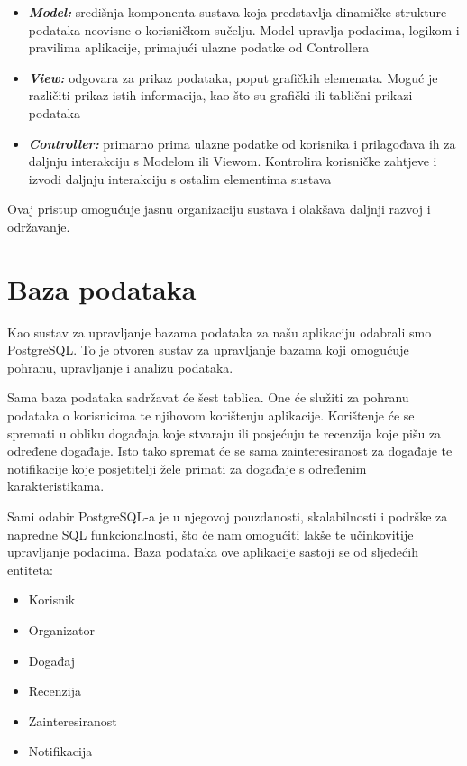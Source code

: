 	\begin{itemize}
		\item 	\textit{\textbf{Model:}}	središnja komponenta sustava koja predstavlja dinamičke strukture podataka neovisne o korisničkom sučelju. Model upravlja podacima, logikom i pravilima aplikacije, primajući ulazne podatke od Controllera
		\item 	\textit{\textbf{View:}}	odgovara za prikaz podataka, poput grafičkih elemenata. Moguć je različiti prikaz istih informacija, kao što su grafički ili tablični prikazi podataka
		\item 	\textit{\textbf{Controller:}} primarno prima ulazne podatke od korisnika i prilagođava ih za daljnju interakciju s Modelom ili Viewom. Kontrolira korisničke zahtjeve i izvodi daljnju interakciju s ostalim elementima sustava
	\end{itemize}
	
	Ovaj pristup omogućuje jasnu organizaciju sustava i olakšava daljnji razvoj i održavanje.

		

				
		\section{Baza podataka}
			
			
		Kao sustav za upravljanje bazama podataka za našu aplikaciju odabrali smo PostgreSQL. To je otvoren sustav za upravljanje bazama koji omogućuje pohranu, upravljanje i analizu podataka.
			
		Sama baza podataka sadržavat će šest tablica. One će služiti za pohranu podataka o korisnicima te njihovom korištenju aplikacije. Korištenje će se spremati u obliku događaja koje stvaraju ili posjećuju te recenzija koje pišu za određene događaje. Isto tako spremat će se sama zainteresiranost za događaje te notifikacije koje posjetitelji žele primati za događaje s određenim karakteristikama.
			
		Sami odabir PostgreSQL-a je u njegovoj pouzdanosti, skalabilnosti i podrške za napredne SQL funkcionalnosti, što će nam omogućiti lakše te učinkovitije upravljanje podacima.
			Baza podataka ove aplikacije sastoji se od sljedećih entiteta: 
			\begin{itemize}
			\item 	Korisnik
			\item 	Organizator	
			\item 	Događaj
			\item 	Recenzija
			\item 	Zainteresiranost
			\item 	Notifikacija
		\end{itemize}
		
